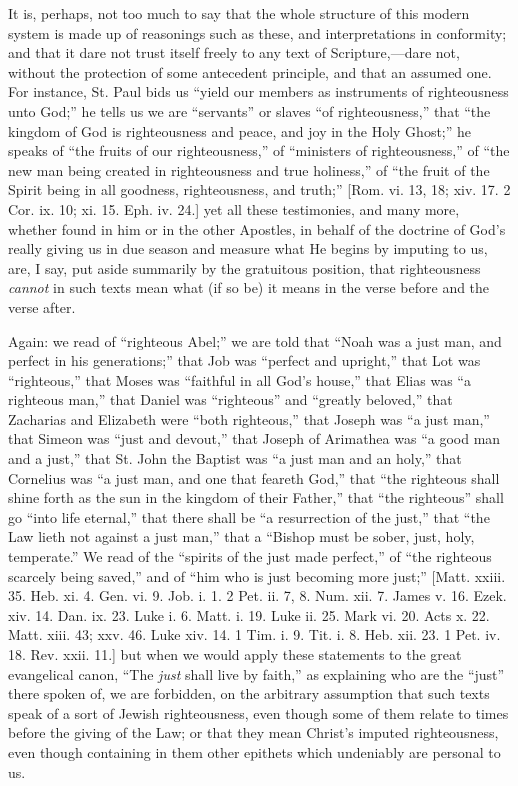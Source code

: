 It is, perhaps, not too much to say that the whole structure of
this modern system is made up of reasonings such as these, and
interpretations in conformity; and that it dare not trust itself
freely to any text of Scripture,—dare not, without the protection of
some antecedent principle, and that an assumed one. For instance, St.
Paul bids us ``yield our members as instruments of righteousness
unto God;'' he tells us we are ``servants'' or slaves
``of righteousness,'' that ``the kingdom of God is
righteousness and peace, and joy in the Holy Ghost;'' he speaks of
``the fruits of our righteousness,'' of ``ministers of
righteousness,'' of ``the new man being created in
righteousness and true holiness,'' of ``the fruit of the
Spirit being in all goodness, righteousness, and truth;'' [Rom.
vi. 13, 18; xiv. 17. 2 Cor. ix. 10; xi. 15. Eph. iv. 24.] yet all
these testimonies, and many more, whether found in him or in the other
Apostles, in behalf of the doctrine of God's really giving us in due
season and measure what He begins by imputing to us, are, I say, put
aside summarily by the gratuitous position, that righteousness \emph{cannot}
in such texts mean what (if so be) it means in the verse before and
the verse after.

Again: we read of ``righteous Abel;'' we are told that
``Noah was a just man, and perfect in his generations;'' that
Job was ``perfect and upright,'' that Lot was
``righteous,'' that Moses was ``faithful in all God's
house,'' that Elias was ``a righteous man,'' that Daniel
was ``righteous'' and ``greatly beloved,'' that
Zacharias and Elizabeth were ``both righteous,'' that Joseph
was ``a just man,'' that Simeon was ``just and
devout,'' that Joseph of Arimathea was ``a good man and a
just,'' that St. John the Baptist was ``a just man and an
holy,'' that Cornelius was ``a just man, and one that feareth
God,'' that ``the righteous shall shine forth as the sun in
the kingdom of their Father,'' that ``the righteous''
shall go ``into life eternal,'' that there shall be ``a
resurrection of the just,'' that ``the Law lieth not against a
just man,'' that a ``Bishop must be sober, just, holy,
temperate.'' We read of the ``spirits of the just made
perfect,'' of ``the righteous scarcely being saved,'' and
of ``him who is just becoming more just;'' [Matt. xxiii. 35.
Heb. xi. 4. Gen. vi. 9. Job. i. 1. 2 Pet. ii. 7, 8. Num. xii. 7. James
v. 16. Ezek. xiv. 14. Dan. ix. 23. Luke i. 6. Matt. i. 19. Luke ii.
25. Mark vi. 20. Acts x. 22. Matt. xiii. 43; xxv. 46. Luke xiv. 14. 1
Tim. i. 9. Tit. i. 8. Heb. xii. 23. 1 Pet. iv. 18. Rev. xxii. 11.] but
when we would apply these statements to the great evangelical canon,
``The \emph{just} shall live by faith,'' as explaining who are
the ``just'' there spoken of, we are forbidden, on the
arbitrary assumption that such texts speak of a sort of Jewish
righteousness, even though some of them relate to times before the
giving of the Law; or that they mean Christ's imputed righteousness,
even though containing in them other epithets which undeniably are
personal to us.

